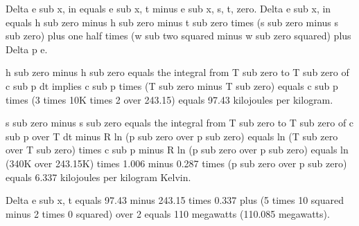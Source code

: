 Delta e sub x, in equals e sub x, t minus e sub x, s, t, zero. Delta e sub x, in equals h sub zero minus h sub zero minus t sub zero times (s sub zero minus s sub zero) plus one half times (w sub two squared minus w sub zero squared) plus Delta p e.

h sub zero minus h sub zero equals the integral from T sub zero to T sub zero of c sub p dt implies c sub p times (T sub zero minus T sub zero) equals c sub p times (3 times 10K times 2 over 243.15) equals 97.43 kilojoules per kilogram.

s sub zero minus s sub zero equals the integral from T sub zero to T sub zero of c sub p over T dt minus R ln (p sub zero over p sub zero) equals ln (T sub zero over T sub zero) times c sub p minus R ln (p sub zero over p sub zero) equals ln (340K over 243.15K) times 1.006 minus 0.287 times (p sub zero over p sub zero) equals 6.337 kilojoules per kilogram Kelvin.

Delta e sub x, t equals 97.43 minus 243.15 times 0.337 plus (5 times 10 squared minus 2 times 0 squared) over 2 equals 110 megawatts (110.085 megawatts).